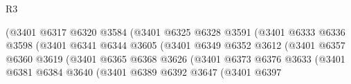 \begin{lexlean}{R3}
\begin{coremodule}
                                              (@3401
                                                @6317
                                                @6320
                                                @3584
                                                (@3401
                                                  @6325
                                                  @6328
                                                  @3591
                                                  (@3401
                                                    @6333
                                                    @6336
                                                    @3598
                                                    (@3401
                                                      @6341
                                                      @6344
                                                      @3605
                                                      (@3401
                                                        @6349
                                                        @6352
                                                        @3612
                                                        (@3401
                                                          @6357
                                                          @6360
                                                          @3619
                                                          (@3401
                                                            @6365
                                                            @6368
                                                            @3626
                                                            (@3401
                                                              @6373
                                                              @6376
                                                              @3633
                                                              (@3401
                                                                @6381
                                                                @6384
                                                                @3640
                                                                (@3401
                                                                  @6389
                                                                  @6392
                                                                  @3647
                                                                  (@3401
                                                                    @6397

\end{coremodule}
\end{lexlean}

